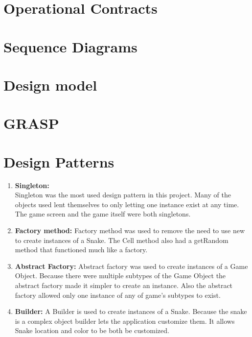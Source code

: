 \documentclass[titlepage]{article}
\begin{document}
	\section{Operational Contracts}
	
	\section{Sequence Diagrams}
	
	\section{Design model}
	
	\section{GRASP}
	
	\section{Design Patterns}
		\begin{enumerate}
			\item \textbf{Singleton:}\\
				Singleton was the most used design pattern in this project. Many of the objects used lent themselves to only letting one instance exist at any
				time. The game screen and the game itself were both singletons.
			\item \textbf{Factory method:}
				Factory method was used to remove the need to use new to create instances of a Snake. The Cell method also had a getRandom method that functioned much like a factory.
			\item \textbf{Abstract Factory:}
				Abstract factory was used to create instances of a Game Object. Because there were multiple subtypes of the Game Object the abstract factory made it simpler to create an instance. Also the abstract factory allowed only one instance of any of game's subtypes to exist.
			\item \textbf{Builder:}
				A Builder is used to create instances of a Snake. Because the snake is a complex object builder lets the application customize them. It allows Snake location and color to be both be customized.
		\end{enumerate}
\end{document}

